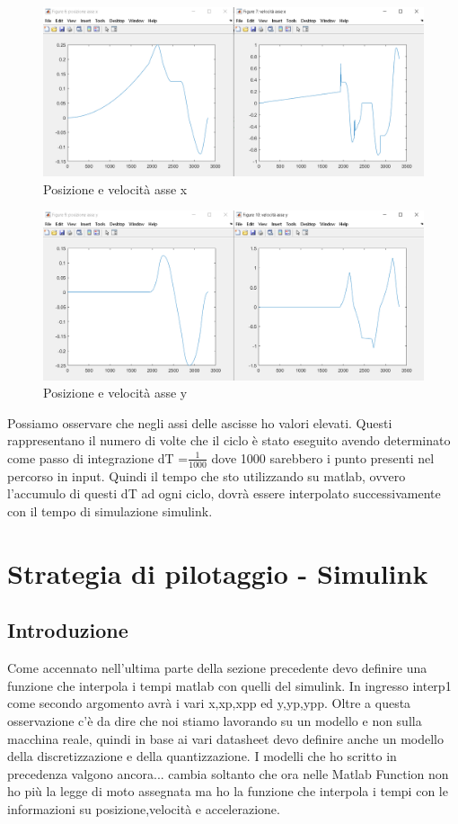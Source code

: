 \documentclass{article}
\begin{document}
\begin{figure}[H]
\centering
\includegraphics[width=.9\textwidth]{./strategia/assex.png}
\caption{ Posizione e velocità asse x}
\end{figure}

\begin{figure}[H]
\centering
\includegraphics[width=.9\textwidth]{./strategia/assey.png}
\caption{ Posizione e velocità asse y}
\end{figure}
Possiamo osservare che negli assi delle ascisse ho valori elevati. Questi rappresentano il numero di volte che il ciclo è stato eseguito avendo determinato come passo di integrazione dT =$ \frac{1}{1000} $ dove 1000 sarebbero i punto presenti nel percorso in input.
Quindi il tempo che sto utilizzando su matlab, ovvero l'accumulo di questi dT ad ogni ciclo, dovrà essere interpolato successivamente con il tempo di simulazione simulink.
\section{Strategia di pilotaggio - Simulink}
\subsection{Introduzione}
Come accennato nell'ultima parte della sezione precedente devo definire una funzione che interpola i tempi matlab con quelli del simulink. In ingresso interp1 come secondo argomento avrà i vari x,xp,xpp ed y,yp,ypp. Oltre a questa osservazione  c'è da dire che noi stiamo lavorando su un modello e non sulla macchina reale, quindi in base ai vari datasheet devo definire anche un modello della discretizzazione e della quantizzazione.
I modelli che ho scritto in precedenza valgono ancora... cambia soltanto che ora nelle Matlab Function non ho più la legge di moto assegnata ma ho la funzione che interpola i tempi con le informazioni su posizione,velocità e accelerazione.
\end{document}
